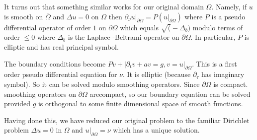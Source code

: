 It turns out that something similar works for our original domain
$\Omega$. Namely, if $u$ is smooth  on $\bar{\Omega}$ and $\Delta u =0
$ on $\Omega$   then $ \partial_ \nu u | _{\partial \Omega}= P(u |
_{\partial \Omega})$ where $P$ is a pseudo differential operator of
order  $1$ on $\partial \Omega$ which  equals $\surd (-\Delta _b)$
modulo terms of order $\leq 0$ where $\Delta _b $ is the Laplace
-Beltrami operator  on $\partial \Omega$. In particular, $P$ is
elliptic and has real principal symbol. 

The boundary conditions become $Pv +| \partial_t v + av = g,  v = u |
_{\partial \Omega}$. This is a first order pseudo differential
equation for $\nu$. It is elliptic (because $ \partial _\tau$ has
imaginary symbol). So it can be solved modulo smoothing
operators. Since $\partial \Omega $  is compact. smoothing operators
on $\partial \Omega $  are\pageoriginale compact,  so  our boundary equation can be
solved provided $g$ is orthogonal to some finite dimensional space of
smooth functions. 

Having done this, we have reduced our original problem to the familiar
Dirichlet problem $ \Delta u = 0 $ in $\Omega$ and $ u | _{\partial
  \Omega}= \nu $ which has a unique solution. 
